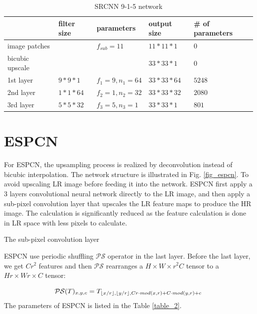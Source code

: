 \documentclass[12pt,journal,compsoc]{IEEEtran}
\DeclarePairedDelimiter\floor{\lfloor}{\rfloor}
\begin{document}
\begin{table}[]
\normalsize
\caption{SRCNN 9-1-5 network} 
\label{table_1} 
\centering
\begin{tabular}{|l|l|l|l|l|}
\hline
              & filter size   & parameters      & output size & \# of parameters 	\\ \hline
image patches &               & $f_{sub}=11$    & $11*11*1$   & $0$  	\\
    \hline
bicubic upscale &               &    & $33*33*1$   & $0$  	\\ \hline
1st layer     & $9*9*1$       & $f_1=9, n_1=64$ & $33*33*64$  & $5248$ 	\\ \hline
2nd layer     & $1*1*64$      & $f_2=1, n_2=32$ & $33*33*32$  & $2080$ 	\\ \hline
3rd layer     & $5*5*32$      & $f_3=5,n_3=1$   & $33*33*1$   & $801$  	\\ \hline
\end{tabular}
\vspace*{4pt}
\end{table}


\section{ESPCN}
For ESPCN\cite{DBLP:journals/corr/ShiCHTABRW16}, the upsampling process is realized by deconvolution instead of bicubic interpolation. The network structure is illustrated in Fig. \ref{fig_espcn}.
To avoid upscaling LR image before feeding it into the network. ESPCN first apply a 3 layers convolutional neural network directly to the LR image, and then apply a sub-pixel convolution layer that upscales the LR feature maps to produce the HR image. The calculation is significantly reduced as the feature calculation is done in LR space with less pixels to calculate.

The sub-pixel convolution layer 

ESPCN use periodic shuffling $\mathcal{PS}$ operator in the last layer. Before the last layer, we get $Cr^2$ features and then $\mathcal{PS}$ rearranges a $H\times W \times r^2 C$ tensor to a $Hr \times Wr \times C$ tensor:

\begin{equation} 
\mathcal{PS}(T)_{x,y,c} = T_{\floor*{x/r},\floor*{y/r},Cr \cdot mod(x,r)+C \cdot mod(y,r) + c}
\end{equation}
The parameters of ESPCN is listed in the Table \ref{table_2}.
\end{document}
